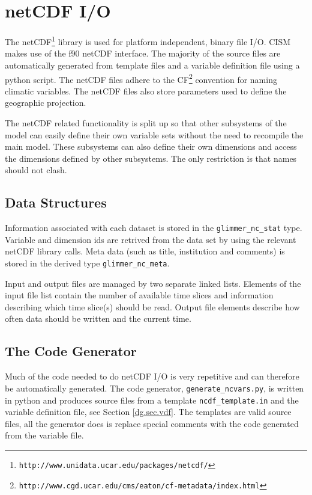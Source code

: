 \section{netCDF I/O}
\label{app:netcdfio}
The netCDF\footnote{\texttt{http://www.unidata.ucar.edu/packages/netcdf/}} library 
is used for platform independent, binary file I/O. CISM makes use of the f90 netCDF interface. 
The majority of the source files are automatically generated from template files and 
a variable definition file using a python script. The netCDF files adhere to the 
CF\footnote{\texttt{http://www.cgd.ucar.edu/cms/eaton/cf-metadata/index.html}} 
convention for naming climatic variables. The netCDF files also store parameters used to define the geographic projection.

The netCDF related functionality is split up so that other subsystems of the model 
can easily define their own variable sets without the need to recompile the main model. 
These subsystems can also define their own dimensions and access the dimensions 
defined by other subsystems. The only restriction is that names should not clash. 

\subsection{Data Structures}
Information associated with each dataset is stored in the \texttt{glimmer\_nc\_stat} type. Variable and dimension ids are retrived from the data set by using the relevant netCDF library calls. Meta data (such as title, institution and comments) is stored in the derived type \texttt{glimmer\_nc\_meta}.

Input and output files are managed by two separate linked lists. Elements of the input file list contain the number of available time slices and information describing which time slice(s) should be read. Output file elements describe how often data should be written and the current time.

\subsection{The Code Generator}
Much of the code needed to do netCDF I/O is very repetitive and can therefore 
be automatically generated. The code generator, \texttt{generate\_ncvars.py}, 
is written in python and produces source files from a template \texttt{ncdf\_template.in} 
and the variable definition file, see Section \ref{dg.sec.vdf}. The templates are
valid source files, all the generator does is replace special comments with 
the code generated from the variable file. 


